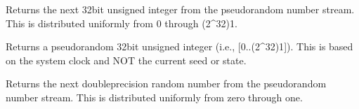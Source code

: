 \documentclass[letterpaper,10pt,english]{sphinxmanual}
\begin{document}
\begin{fulllineitems}

\begin{fulllineitems}
\label{\detokenize{lysis.util:lysis.util.kiss.KissRandomGenerator.kiss32}}
\pysigstartsignatures
{}
\pysigstopsignatures
\sphinxAtStartPar
Returns the next 32\sphinxhyphen{}bit unsigned integer from the pseudo\sphinxhyphen{}random
number stream. This is distributed uniformly from 0 through (2\textasciicircum{}32)\sphinxhyphen{}1.

\end{fulllineitems}


\begin{fulllineitems}
\label{\detokenize{lysis.util:lysis.util.kiss.KissRandomGenerator.mscw}}
\pysigstartsignatures
{}
\pysigstopsignatures
\sphinxAtStartPar
Returns a pseudo\sphinxhyphen{}random 32\sphinxhyphen{}bit unsigned integer
(i.e., {[}0..(2\textasciicircum{}32)\sphinxhyphen{}1{]}).
This is based on the system clock and NOT the current seed or state.

\end{fulllineitems}


\begin{fulllineitems}
\label{\detokenize{lysis.util:lysis.util.kiss.KissRandomGenerator.random}}
\pysigstartsignatures
{}
\pysigstopsignatures
\sphinxAtStartPar
Returns the next double\sphinxhyphen{}precision random number from the
pseudo\sphinxhyphen{}random number stream. This is distributed uniformly from zero
through one.

\end{fulllineitems}


\end{fulllineitems}
\end{document}
